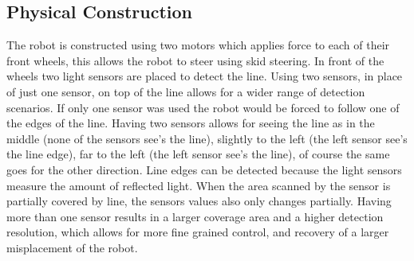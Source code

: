 \documentclass[final, english, a4paper]{article}
\begin{document}
	\subsection{Physical Construction} %
	    \label{robot:physicalContruction}
	    The robot is constructed using two motors which applies force to
	    each of their front wheels, this allows the robot to steer using skid steering.
	    In front of the wheels two light sensors are placed to detect the line. Using
	    two sensors, in place of just one sensor, on top of the line allows for a wider
	    range of detection scenarios. If only one sensor was used the robot would be forced to follow one
	    of the edges of the line. Having two sensors allows for seeing the line
	    as in the middle (none of the sensors see's the line), slightly to the left (the left sensor see's the
	    line edge), far to the left (the left sensor see's the line), of course the same
	    goes for the other direction. Line edges can be detected
	    because the light sensors measure the amount of reflected light. 
	    When the area scanned by the sensor is partially covered by line, the sensors values also only changes partially. 
	    Having more than one sensor results in a larger coverage area and a higher detection resolution,
	    which allows for more fine grained control, and recovery of a larger misplacement of the robot.
\end{document}
